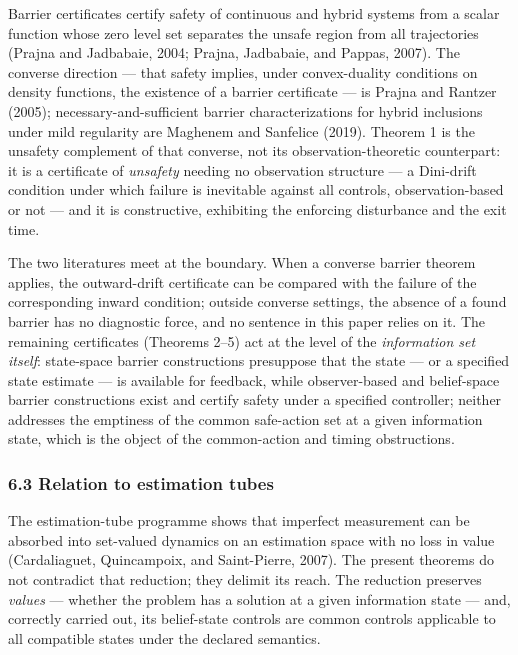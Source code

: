 \documentclass[11pt]{article}
\begin{document}
Barrier certificates certify safety of continuous and hybrid systems
from a scalar function whose zero level set separates the unsafe region
from all trajectories (Prajna and Jadbabaie, 2004; Prajna, Jadbabaie,
and Pappas, 2007). The converse direction --- that safety implies, under
convex-duality conditions on density functions, the existence of a
barrier certificate --- is Prajna and Rantzer (2005);
necessary-and-sufficient barrier characterizations for hybrid inclusions
under mild regularity are Maghenem and Sanfelice (2019). Theorem 1 is
the unsafety complement of that converse, not its observation-theoretic
counterpart: it is a certificate of \emph{unsafety} needing no
observation structure --- a Dini-drift condition under which failure is
inevitable against all controls, observation-based or not --- and it is
constructive, exhibiting the enforcing disturbance and the exit time.

The two literatures meet at the boundary. When a converse barrier
theorem applies, the outward-drift certificate can be compared with the
failure of the corresponding inward condition; outside converse
settings, the absence of a found barrier has no diagnostic force, and no
sentence in this paper relies on it. The remaining certificates
(Theorems 2--5) act at the level of the \emph{information set itself}:
state-space barrier constructions presuppose that the state --- or a
specified state estimate --- is available for feedback, while
observer-based and belief-space barrier constructions exist and certify
safety under a specified controller; neither addresses the emptiness of
the common safe-action set at a given information state, which is the
object of the common-action and timing obstructions.

\subsubsection{6.3 Relation to estimation
tubes}\label{relation-to-estimation-tubes}

The estimation-tube programme shows that imperfect measurement can be
absorbed into set-valued dynamics on an estimation space with no loss in
value (Cardaliaguet, Quincampoix, and Saint-Pierre, 2007). The present
theorems do not contradict that reduction; they delimit its reach. The
reduction preserves \emph{values} --- whether the problem has a solution
at a given information state --- and, correctly carried out, its
belief-state controls are common controls applicable to all compatible
states under the declared semantics.
\end{document}
